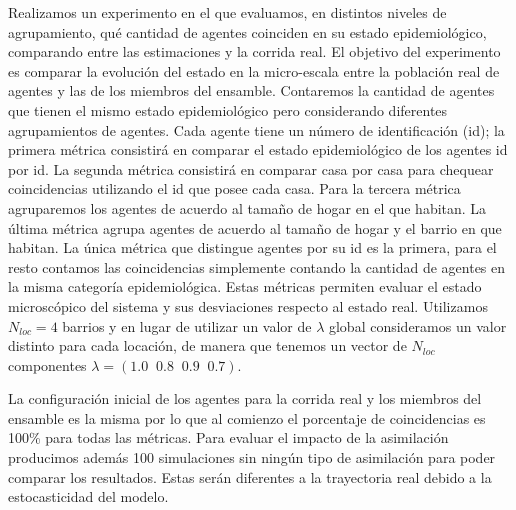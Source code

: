 Realizamos un experimento en el que evaluamos, en distintos niveles de agrupamiento, qué cantidad de agentes coinciden en su estado epidemiológico,  comparando entre las estimaciones y la corrida real. El objetivo del experimento es comparar la evolución del estado en la micro-escala entre la población real de agentes y las de los miembros del ensamble. Contaremos la cantidad de agentes que tienen el mismo estado epidemiológico pero considerando diferentes agrupamientos de agentes. Cada agente tiene un número de identificación (id); la primera métrica consistirá en comparar el estado epidemiológico de los agentes id por id. La segunda métrica consistirá en comparar casa por casa para chequear coincidencias utilizando el id que posee cada casa. Para la tercera métrica agruparemos los agentes de acuerdo al tamaño de hogar en el que habitan. La última métrica agrupa agentes de acuerdo al tamaño de hogar y el barrio en que habitan. La única métrica que distingue agentes por su id es la primera, para el resto contamos las coincidencias simplemente contando la cantidad de agentes en la misma categoría epidemiológica. Estas métricas permiten evaluar el estado microscópico del sistema y sus desviaciones respecto al estado real. Utilizamos $N_{loc} = 4$ barrios y en lugar de utilizar un valor de $\lambda$ global consideramos un valor distinto para cada locación, de manera que tenemos un vector de $N_{loc}$ componentes $\lambda = (1.0\;\; 0.8\;\; 0.9\;\; 0.7)$. 

La configuración inicial de los agentes para la corrida real y los miembros del ensamble es la misma por lo que al comienzo el porcentaje de coincidencias es 100\% para todas las métricas. Para evaluar el impacto de la asimilación  producimos además 100 simulaciones sin ningún tipo de asimilación para poder comparar los resultados. Estas serán diferentes a la trayectoria real debido a la estocasticidad del modelo.

